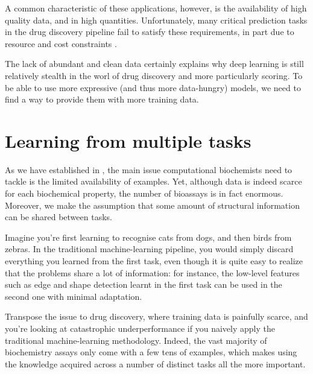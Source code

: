 \documentclass[11pt]{article}
\numberwithin{equation}{subsection}
\begin{document}
A common characteristic of these applications, however, is the availability of high quality data, and in high quantities.
Unfortunately, many critical prediction tasks in the drug discovery pipeline fail to satisfy these requirements, in part due to resource and cost constraints \citep{cherkasov2014qsar}.

The lack of abundant and clean data certainly explains why deep learning is still relatively stealth in the worl of drug discovery and more particularly scoring. To be able to use more expressive (and thus more data-hungry) models, we need to find a way to provide them with more training data.










\clearpage
\section{Learning from multiple tasks}

As we have established in , the main issue computational biochemists need to tackle is the limited availability of examples. Yet, although data is indeed scarce for each biochemical property, the number of bioassays is in fact enormous. Moreover, we make the assumption that some amount of structural information can be shared between tasks.

Imagine you’re first learning to recognise cats from dogs, and then birds from zebras. In the traditional machine-learning pipeline, you would simply discard everything you learned from the first task, even though it is quite easy to realize that the problems share a lot of information: for instance, the low-level features such as edge and shape detection learnt in the first task can be used in the second one with minimal adaptation.

Transpose the issue to drug discovery, where training data is painfully scarce, and you’re looking at catastrophic underperformance if you naively apply the traditional machine-learning methodology. Indeed, the vast majority of biochemistry assays only come with a few tens of examples, which makes using the knowledge acquired across a number of distinct tasks all the more important.
\end{document}
